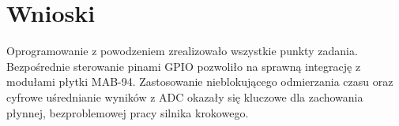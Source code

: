\documentclass[11pt, a4paper]{article}
\begin{document}
\section{Wnioski}
Oprogramowanie z powodzeniem zrealizowało wszystkie punkty zadania. Bezpośrednie sterowanie pinami GPIO pozwoliło na sprawną integrację z modułami płytki MAB-94. Zastosowanie nieblokującego odmierzania czasu oraz cyfrowe uśrednianie wyników z ADC okazały się kluczowe dla zachowania płynnej, bezproblemowej pracy silnika krokowego.
\end{document}
